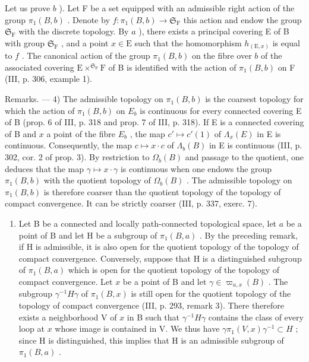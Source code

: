 Let us prove \(b\) ). Let F be a set equipped with an admissible right action of the group \(\pi_1(B,b)\) . Denote by \(f: \pi_1(B,b) \to \mathfrak{S}_{\mathrm{F}}\) this action and endow the group \(\mathfrak{S}_{\mathrm{F}}\) with the discrete topology. By \(a\) ), there exists a principal covering E of B with group \(\mathfrak{S}_{\mathrm{F}}\) , and a point \(x \in \mathrm{E}\) such that the homomorphism \(h_{(\mathrm{E},x)}\) is equal to \(f\) . The canonical action of the group \(\pi_1(B,b)\) on the fibre over \(b\) of the associated covering \(\mathrm{E} \times^{\mathfrak{S}_{\mathrm{F}}} \mathrm{F}\) of B is identified with the action of \(\pi_1(B,b)\) on F (III, p. 306, example 1).

Remarks. --- 4) The admissible topology on \(\pi_1(B, b)\) is the coarsest topology for which the action of \(\pi_1(B, b)\) on \(E_b\) is continuous for every connected covering E of B (prop. 6 of III, p. 318 and prop. 7 of III, p. 318). If E is a connected covering of B and \(x\) a point of the fibre \(E_b\) , the map \(c' \mapsto c'(1)\) of \(\Lambda_x(E)\) in E is continuous. Consequently, the map \(c \mapsto x \cdot c\) of \(\Lambda_b(B)\) in E is continuous (III, p. 302, cor. 2 of prop. 3). By restriction to \(\Omega_b(B)\) and passage to the quotient, one deduces that the map \(\gamma \mapsto x \cdot \gamma\) is continuous when one endows the group \(\pi_1(B, b)\) with the quotient topology of \(\Omega_b(B)\) . The admissible topology on \(\pi_{1}(B,b)\) is therefore coarser than the quotient topology of the topology of compact convergence. It can be strictly coarser (III, p. 337, exerc. 7).

\begin{enumerate}
\def\labelenumi{\arabic{enumi})}
\setcounter{enumi}{4}
\tightlist
\item
  Let B be a connected and locally path-connected topological space, let \(a\) be a point of B and let H be a subgroup of \(\pi_1(B,a)\) . By the preceding remark, if H is admissible, it is also open for the quotient topology of the topology of compact convergence. Conversely, suppose that H is a distinguished subgroup of \(\pi_1(B,a)\) which is open for the quotient topology of the topology of compact convergence. Let \(x\) be a point of B and let \(\gamma \in \varpi_{a,x}(B)\) . The subgroup \(\gamma^{-1}H\gamma\) of \(\pi_1(B,x)\) is still open for the quotient topology of the topology of compact convergence (III, p. 293, remark 3). There therefore exists a neighborhood V of \(x\) in B such that \(\gamma^{-1}H\gamma\) contains the class of every loop at \(x\) whose image is contained in V. We thus have \(\gamma \pi_1(V,x)\gamma^{-1} \subset H\) ; since H is distinguished, this implies that H is an admissible subgroup of \(\pi_1(B,a)\) .
\end{enumerate}

